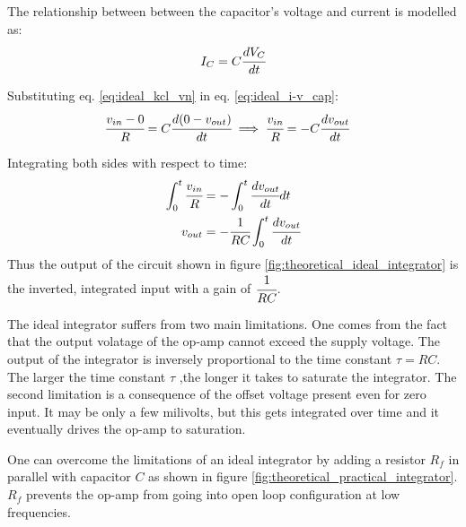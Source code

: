 \documentclass[12pt, titlepage]{article}
\theoremstyle{definition}
\begin{document}
    The relationship between between the capacitor's voltage and current is modelled as:
    \begin{equation}\label{eq:ideal_i-v_cap}
      I_C = C\cfrac{dV_C}{dt}
    \end{equation}

    Substituting eq. \ref{eq:ideal_kcl_vn} in eq. \ref{eq:ideal_i-v_cap}:
    \begin{align*}
      \cfrac{v_{in} - 0}{R} &= C\cfrac{d(0 - v_{out})}{dt}
      \implies \cfrac{v_{in}}{R} = -C\cfrac{dv_{out}}{dt}
    \end{align*}

    Integrating both sides with respect to time:
    \begin{align*}
      \int_0^t {\cfrac{v_{in}}{R}} &= - \int_0^t {\cfrac{dv_{out}}{dt}dt} \\
      v_{out} &= -\cfrac{1}{RC} \int_0^t {\cfrac{dv_{out}}{dt}}
    \end{align*}
    Thus the output of the circuit shown in figure \ref{fig:theoretical_ideal_integrator} is the inverted, integrated input with a gain of $\cfrac{1}{RC}$.

    The ideal integrator suffers from two main limitations. One comes from the fact that the output volatage of the op-amp cannot exceed the supply voltage.
    The output of the integrator is inversely proportional to the time constant $\tau = RC$.
    The larger the time constant $\tau$ ,the longer it takes to saturate the integrator.
    The second limitation is a consequence of the offset voltage present even for zero input.
    It may be only a few milivolts, but this gets integrated over time and it eventually drives the op-amp to saturation.

    One can overcome the limitations of an ideal integrator by adding a resistor $R_{f}$ in parallel with capacitor $C$ as shown in figure \ref{fig:theoretical_practical_integrator}. $R_{f}$ prevents the op-amp from going into open loop configuration at low frequencies.
\end{document}
